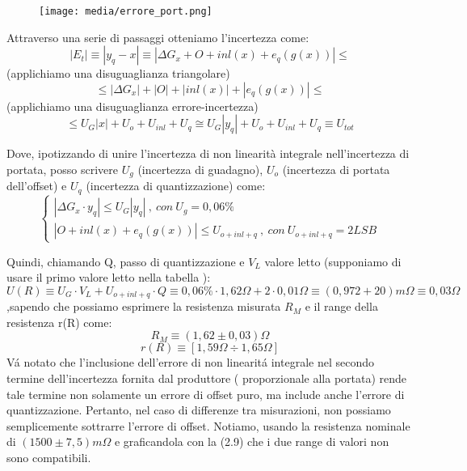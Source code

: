 \begin{figure} [h]
    \centering
    \texttt{[image: media/errore\_port.png]}
    \label{fig:errore port}
\end{figure}

Attraverso una serie di passaggi otteniamo l'incertezza come:
\begin{equation}
    |E_t| \equiv |y_q - x| \equiv | \Delta G_x + O + inl(x) + e_q(g(x)) | \leq 
\end{equation}
(applichiamo una disuguaglianza triangolare)
\begin{equation}
    \leq | \Delta G_x | + | O | + | inl(x) | + | e_q(g(x)) | \leq 
\end{equation}
(applichiamo una disuguaglianza errore-incertezza)
\begin{equation}
    \leq U_G|x| + U_o + U_{inl} + U_q \cong U_G|y_q| + U_o + U_{inl} +U_q \equiv U_{tot}
\end{equation}

Dove, ipotizzando di unire l'incertezza di non linearità integrale nell'incertezza di portata, posso scrivere $U_g$ (incertezza di guadagno), $U_o$ (incertezza di portata dell'offset) e $U_q$ (incertezza di quantizzazione) come: 
\begin{equation}
    \left\{ \begin{array}{rcl}
| \Delta G_x \cdot y_q | \leq U_G |y_q| \ , \ con \ U_g=0,06\% \\

| O + inl(x) + e_q(g(x)) | \leq U_{o+inl+q} \ , \ con \ U_{o+inl+q}=2LSB
\end{array}\right.
\end{equation}

Quindi, chiamando Q, passo di quantizzazione e $V_L$ valore letto (supponiamo di usare il primo valore letto nella tabella \label{mult_port}):
\begin{equation}
    U(R) \equiv U_G \cdot V_L + U_{o+inl+q} \cdot Q \equiv 0,06\% \cdot 1,62\Omega + 2 \cdot 0,01 \Omega \equiv (0,972 + 20) m\Omega \equiv 0,03 \Omega
\end{equation}
,sapendo che possiamo esprimere la resistenza misurata $R_M$ e il range della resistenza r(R) come:
\begin{equation}
    R_M \equiv(1,62 \pm 0,03) \Omega
\end{equation}
\begin{equation}
    r(R) \equiv [1,59 \Omega \div 1,65 \Omega]
\end{equation}
V\'a notato che l'inclusione dell'errore di non linearit\'a integrale nel secondo termine dell'incertezza fornita dal produttore ( proporzionale alla portata) rende tale termine non solamente un errore di offset puro, ma include anche l'errore di quantizzazione. Pertanto, nel caso di differenze tra misurazioni, non possiamo semplicemente sottrarre l'errore di offset.
Notiamo, usando la resistenza nominale di $(1500 \pm 7,5) m\Omega$ e graficandola con la (2.9) che i due range di valori non sono compatibili.

